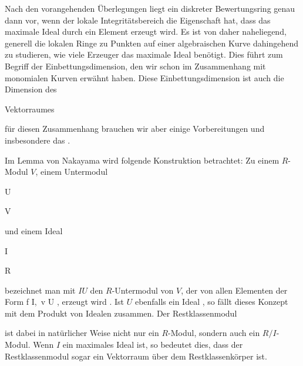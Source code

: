 

Nach den vorangehenden Überlegungen liegt ein diskreter Bewertungsring genau dann vor, wenn der lokale Integritätsbereich die Eigenschaft hat, dass das maximale Ideal durch ein Element erzeugt wird. Es ist von daher naheliegend, generell die lokalen Ringe zu Punkten auf einer algebraischen Kurve dahingehend zu studieren, wie viele Erzeuger das maximale Ideal benötigt. Dies führt zum Begriff der Einbettungsdimension, den wir schon im Zusammenhang mit monomialen Kurven erwähnt haben. Diese Einbettungsdimension ist auch die Dimension des

Vektorraumes

 für diesen Zusammenhang brauchen wir aber einige Vorbereitungen und insbesondere das   {.}


Im Lemma von Nakayama wird folgende Konstruktion betrachtet: Zu einem $R$-Modul $V$, einem Untermodul


\mavergleichskette

{\vergleichskette

{ U
}

{ \subseteq }{ V
}

{  }{
}

{    }{
}

{   }{
}

}
{}{}{}
und einem Ideal


\mavergleichskette

{\vergleichskette

{ I
}

{ \subseteq }{ R
}

{  }{
}

{    }{
}

{   }{
}

}
{}{}{}
bezeichnet man mit $IU$ den $R$-Untermodul von $V$, der von allen Elementen der Form  {  f \in I,\, v \in U   }{,} erzeugt wird
 {} {.}
Ist $U$ ebenfalls ein Ideal
 {} {,}
so fällt dieses Konzept mit dem Produkt von Idealen zusammen. Der Restklassenmodul

 ist dabei in natürlicher Weise nicht nur ein $R$-Modul, sondern auch ein $R/I$-Modul. Wenn $I$ ein maximales Ideal ist, so bedeutet dies, dass der Restklassenmodul sogar ein Vektorraum über dem Restklassenkörper ist.


